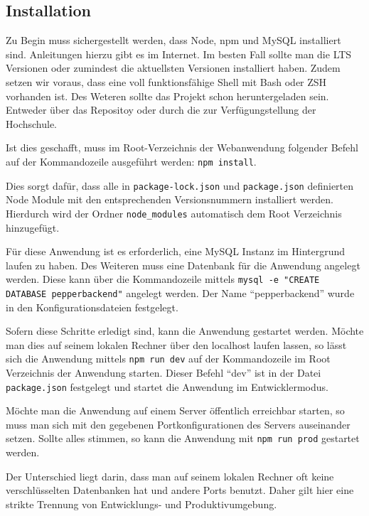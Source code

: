 \subsection*{Installation}
\label{sec:nodechapter-installation}
Zu Begin muss sichergestellt werden, dass Node, npm und MySQL installiert sind. Anleitungen hierzu gibt es im Internet. Im besten Fall sollte man die LTS Versionen oder zumindest die aktuellsten Versionen installiert haben. Zudem setzen wir voraus, dass eine voll funktionsfähige Shell mit Bash oder ZSH vorhanden ist. Des Weteren sollte das Projekt schon heruntergeladen sein. Entweder über das Repositoy oder durch die zur Verfügungstellung der Hochschule.

Ist dies geschafft, muss im Root-Verzeichnis der Webanwendung folgender Befehl auf der Kommandozeile ausgeführt werden: \verb|npm install|.

Dies sorgt dafür, dass alle in \verb|package-lock.json| und \verb|package.json| definierten Node Module mit den entsprechenden Versionsnummern installiert werden. Hierdurch wird der Ordner \verb|node_modules| automatisch dem Root Verzeichnis hinzugefügt.

Für diese Anwendung ist es erforderlich, eine MySQL Instanz im Hintergrund laufen zu haben. Des Weiteren muss eine Datenbank für die Anwendung angelegt werden. Diese kann über die Kommandozeile mittels \verb|mysql -e "CREATE DATABASE pepperbackend"| angelegt werden. Der Name ``pepperbackend'' wurde in den Konfigurationsdateien festgelegt.

Sofern diese Schritte erledigt sind, kann die Anwendung gestartet werden. Möchte man dies auf seinem lokalen Rechner über den localhost laufen lassen, so lässt sich die Anwendung mittels \verb|npm run dev| auf der Kommandozeile im Root Verzeichnis der Anwendung starten. Dieser Befehl ``dev'' ist in der Datei \verb|package.json| festgelegt und startet die Anwendung im Entwicklermodus.

Möchte man die Anwendung auf einem Server öffentlich erreichbar starten, so muss man sich mit den gegebenen Portkonfigurationen
des Servers auseinander setzen. Sollte alles stimmen, so kann die Anwendung mit \verb|npm run prod| gestartet werden.

Der Unterschied liegt darin, dass man auf seinem lokalen Rechner oft keine verschlüsselten Datenbanken hat und andere Ports benutzt.
Daher gilt hier eine strikte Trennung von Entwicklungs- und Produktivumgebung.

